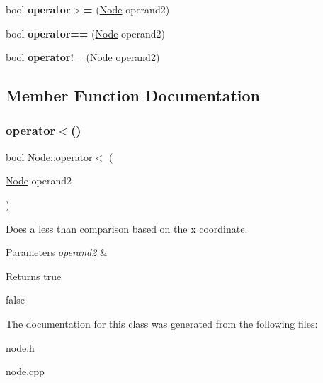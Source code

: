 \begin{DoxyCompactItemize}
\item 
\mbox{\label{classNode_a193b8c52f135714e5b7ca95e4516b1ff}} 
bool {\bfseries operator$>$=} (\hyperlink{classNode}{Node} operand2)
\item 
\mbox{\label{classNode_a7c1303e143bf8c170fbfa8e5fab9f88e}} 
bool {\bfseries operator==} (\hyperlink{classNode}{Node} operand2)
\item 
\mbox{\label{classNode_a6fb364f31ad72d22d3ac821e32233c26}} 
bool {\bfseries operator!=} (\hyperlink{classNode}{Node} operand2)
\end{DoxyCompactItemize}


\subsection{Member Function Documentation}
\mbox{\label{classNode_ab0452101dad47b23bad5419963d85648}} 
\subsubsection{\texorpdfstring{operator$<$()}{operator<()}}
{\footnotesize\ttfamily bool Node\+::operator$<$ (\begin{DoxyParamCaption}\item[{\hyperlink{classNode}{Node}}]{operand2 }\end{DoxyParamCaption})}



Does a less than comparison based on the x coordinate. 


\begin{DoxyParams}{Parameters}
{\em operand2} & \\
\hline
\end{DoxyParams}
\begin{DoxyReturn}{Returns}
true 

false 
\end{DoxyReturn}


The documentation for this class was generated from the following files\+:\begin{DoxyCompactItemize}
\item 
node.\+h\item 
node.\+cpp\end{DoxyCompactItemize}
